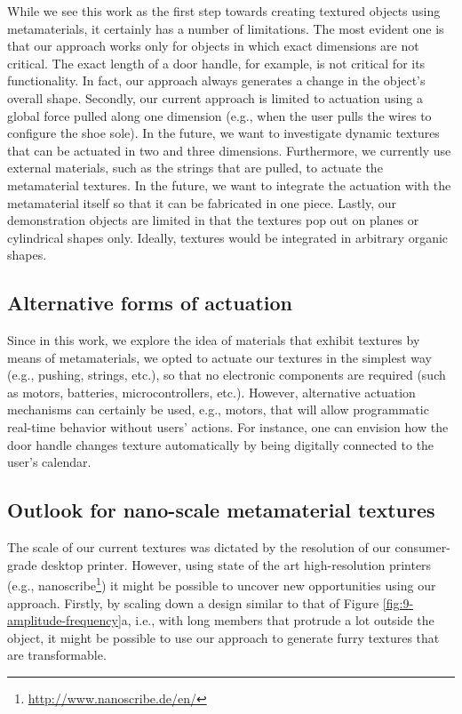 While we see this work as the first step towards creating textured objects using metamaterials, it certainly has a number of limitations. The most evident one is that our approach works only for objects in which exact dimensions are not critical. The exact length of a door handle, for example, is not critical for its functionality. In fact, our approach always generates a change in the object's overall shape. Secondly, our current approach is limited to actuation using a global force pulled along one dimension (e.g., when the user pulls the wires to configure the shoe sole). In the future, we want to investigate dynamic textures that can be actuated in two and three dimensions. Furthermore, we currently use external materials, such as the strings that are pulled, to actuate the metamaterial textures. In the future, we want to integrate the actuation with the metamaterial itself so that it can be fabricated in one piece. Lastly, our demonstration objects are limited in that the textures pop out on planes or cylindrical shapes only. Ideally, textures would be integrated in arbitrary organic shapes. 


\subsection{Alternative forms of actuation}

Since in this work, we explore the idea of materials that exhibit textures by means of metamaterials, we opted to actuate our textures in the simplest way (e.g., pushing, strings, etc.), so that no electronic components are required (such as motors, batteries, microcontrollers, etc.). However, alternative actuation mechanisms can certainly be used, e.g., motors, that will allow programmatic real-time behavior without users’ actions. For instance, one can envision how the door handle changes texture automatically by being digitally connected to the user's calendar.


\subsection{Outlook for nano-scale metamaterial textures}

The scale of our current textures was dictated by the resolution of our consumer-grade desktop printer. However, using state of the art high-resolution printers (e.g., nanoscribe\footnote{\url{http://www.nanoscribe.de/en/}}) it might be possible to uncover new opportunities using our approach. Firstly, by scaling down a design similar to that of Figure \ref{fig:9-amplitude-frequency}a, i.e., with long members that protrude a lot outside the object, it might be possible to use our approach to generate furry textures \cite{Laput2015, Ou2016a} that are transformable. 

